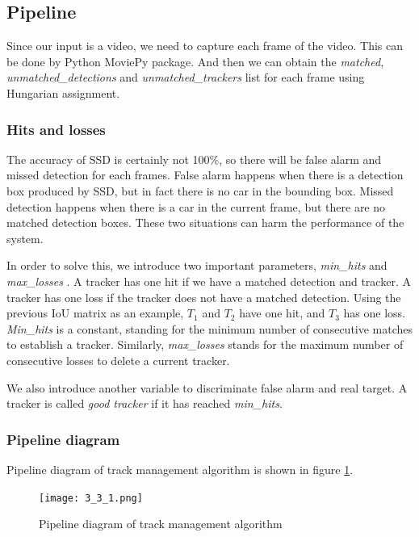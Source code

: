 \documentclass[10pt,twocolumn,letterpaper]{article}
\begin{document}
\subsection{Pipeline}
Since our input is a video, we need to capture each frame of the video. This can be done by Python MoviePy package. And then we can obtain the \emph{matched}, \emph{unmatched\_detections} and \emph{unmatched\_trackers} list for each frame using Hungarian assignment. 

\subsubsection{Hits and losses}
The accuracy of SSD is certainly not 100\%, so there will be false alarm and missed detection for each frames. False alarm happens when there is a detection box produced by SSD, but in fact there is no car in the bounding box. Missed detection happens when there is a car in the current frame, but there are no matched detection boxes. These two situations can harm the performance of the system. 

In order to solve this, we introduce two important parameters, \emph{min\_hits} and \emph{max\_losses} . A tracker has one hit if we have a matched detection and tracker. A tracker has one loss if the tracker does not have a matched detection. Using the previous IoU matrix as an example, $T_1$ and $T_2$ have one hit, and $T_3$ has one loss. \emph{Min\_hits} is a constant, standing for the minimum number of consecutive matches to establish a tracker. Similarly, \emph{max\_losses} stands for the maximum number of consecutive losses to delete a current tracker. 

We also introduce another variable to discriminate false alarm and real target. A tracker is called \emph{good tracker} if it has reached \emph{min\_hits}.

\subsubsection{Pipeline diagram}
Pipeline diagram of track management algorithm is shown in figure \ref{fig:3_3_1}.

\begin{figure}[t]
\begin{center}
   \texttt{[image: 3\_3\_1.png]}
\end{center}
   \caption{Pipeline diagram of track management algorithm}
\label{fig:3_3_1}
\end{figure}
\end{document}
